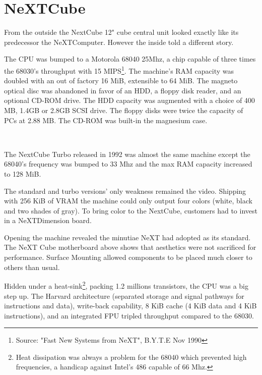 \section{NeXTCube}
From the outside the NextCube 12" cube central unit looked exactly like its predecessor the NeXTComputer. However the inside told a different story.\\
\par
 The CPU was bumped to a Motorola 68040 25Mhz, a chip capable of three times the 68030's throughput with 15 MIPS\footnote{Source: "Fast New Systems from NeXT", B.Y.T.E Nov 1990}. The machine's RAM capacity was doubled with an out of factory 16 MiB, extensible to 64 MiB. The magneto optical disc was abandoned in favor of an HDD, a floppy disk reader, and an optional CD-ROM drive. The HDD capacity was augmented with a choice of 400 MB, 1.4GB or 2.8GB SCSI drive. The floppy disks were twice the capacity of PCs at 2.88 MB. The CD-ROM was built-in the magnesium case.\\
\par
\begin{minipage}{\textwidth}
 \\
\end{minipage}

\par
The NextCube Turbo released in 1992 was almost the same machine except the 68040's frequency was bumped to 33 Mhz and the max RAM capacity increased to 128 MiB.\\
\par
The standard and turbo versions' only weakness remained the video. Shipping with 256 KiB of VRAM the machine could only output four colors (white, black and two shades of gray). To bring color to the NextCube, customers had to invest in a NeXTDimension board.\\
\par

\pagebreak


\par
Opening the machine revealed the minutiae NeXT had adopted as its standard. The NeXT Cube motherboard above shows that aesthetics were not sacrificed for performance. Surface Mounting allowed components to be placed much closer to others than usual.\\
\par
Hidden under a heat-sink\footnote{Heat dissipation was always a problem for the 68040 which prevented high frequencies, a handicap against Intel's 486 capable of 66 Mhz.}, packing 1.2 millions transistors, the CPU was a big step up. The Harvard architecture (separated storage and signal pathways for instructions and data), write-back capability, 8 KiB cache (4 KiB data and 4 KiB instructions), and an integrated FPU tripled throughput compared to the 68030.





